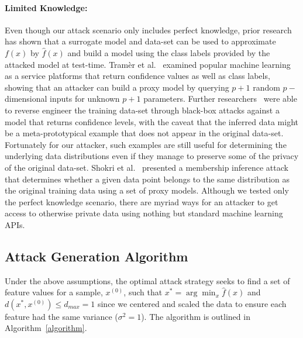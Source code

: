 \documentclass[fonts]{icst}
\begin{document}
\paragraph{Limited Knowledge: }
Even though our attack scenario only includes perfect knowledge, prior research~\cite{fredrikson2015model,biggio2013evasion,chakraborty2018adversarial,wang2019security,ateniese2015hacking} has shown that a surrogate model and data-set can be used to approximate $f(x)$ by $\hat{f}(x)$ and build a model using the class labels provided by the attacked model at test-time. Tram\`er et al.~\cite{tramer2016stealing} examined popular machine learning as a service platforms that return confidence values as well as class labels, showing that an attacker can build a proxy model by querying $ p + 1$ random $p-$dimensional inputs for unknown $p+1$ parameters. Further researchers~\cite{fredrikson2015model} were able to reverse engineer the training data-set through black-box attacks against a model that returns confidence levels, with the caveat that the inferred data might be a meta-prototypical example that does not appear in the original data-set. Fortunately for our attacker, such examples are still useful for determining the underlying data distributions even if they manage to preserve some of the privacy of the original data-set. Shokri et al.~\cite{shokri2017membership} presented a membership inference attack that determines whether a given data point belongs to the same distribution as the original training data using a set of proxy models. Although we tested only the perfect knowledge scenario, there are myriad ways for an attacker to get access to otherwise private data using nothing but standard machine learning APIs. 


\subsection{Attack Generation Algorithm}

Under the above assumptions, the optimal attack strategy seeks to find a set of feature values for a sample, $x^{(0)}$, such that
$x^* = \arg\min_{x}\hat{f}(x)$ and $d(x^*, x^{(0)}) \leq d_{max} = 1$ since we centered and scaled the data to ensure each feature had the same variance ($\sigma^2 = 1$).  The algorithm is outlined in Algorithm~\ref{algorithm}.
\end{document}

